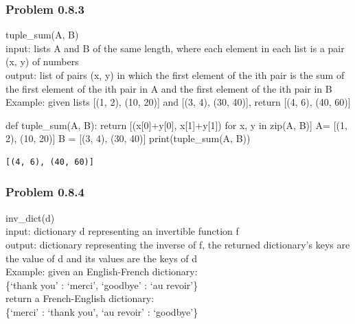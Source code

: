 \documentclass[
  letterpaper,
  DIV=11,
  numbers=noendperiod]{scrartcl}
\newenvironment{Shaded}{\begin{snugshade}}{\end{snugshade}}
\newcommand{\BuiltInTok}[1]{\textcolor[rgb]{0.00,0.23,0.31}{#1}}
\newcommand{\ControlFlowTok}[1]{\textcolor[rgb]{0.00,0.23,0.31}{#1}}
\newcommand{\DecValTok}[1]{\textcolor[rgb]{0.68,0.00,0.00}{#1}}
\newcommand{\KeywordTok}[1]{\textcolor[rgb]{0.00,0.23,0.31}{#1}}
\newcommand{\NormalTok}[1]{\textcolor[rgb]{0.00,0.23,0.31}{#1}}
\newcommand{\OperatorTok}[1]{\textcolor[rgb]{0.37,0.37,0.37}{#1}}
\begin{document}
\hypertarget{problem-0.8.3}{%
\subsubsection{Problem 0.8.3}\label{problem-0.8.3}}

tuple\_sum(A, B)\\
input: lists A and B of the same length, where each element in each list
is a pair (x, y) of numbers\\
output: list of pairs (x, y) in which the first element of the ith pair
is the sum of the first element of the ith pair in A and the first
element of the ith pair in B\\
Example: given lists {[}(1, 2), (10, 20){]} and {[}(3, 4), (30, 40){]},
return {[}(4, 6), (40, 60){]}

\begin{Shaded}
\begin{Highlighting}[numbers=left,,]
\KeywordTok{def}\NormalTok{ tuple\_sum(A, B): }\ControlFlowTok{return}\NormalTok{ [(x[}\DecValTok{0}\NormalTok{]}\OperatorTok{+}\NormalTok{y[}\DecValTok{0}\NormalTok{], x[}\DecValTok{1}\NormalTok{]}\OperatorTok{+}\NormalTok{y[}\DecValTok{1}\NormalTok{]) }\ControlFlowTok{for}\NormalTok{ x, y }\KeywordTok{in} \BuiltInTok{zip}\NormalTok{(A, B)]}
\NormalTok{A}\OperatorTok{=}\NormalTok{ [(}\DecValTok{1}\NormalTok{, }\DecValTok{2}\NormalTok{), (}\DecValTok{10}\NormalTok{, }\DecValTok{20}\NormalTok{)]}
\NormalTok{B }\OperatorTok{=}\NormalTok{ [(}\DecValTok{3}\NormalTok{, }\DecValTok{4}\NormalTok{), (}\DecValTok{30}\NormalTok{, }\DecValTok{40}\NormalTok{)]}
\BuiltInTok{print}\NormalTok{(tuple\_sum(A, B))}
\end{Highlighting}
\end{Shaded}

\begin{verbatim}
[(4, 6), (40, 60)]
\end{verbatim}

\hypertarget{problem-0.8.4}{%
\subsubsection{Problem 0.8.4}\label{problem-0.8.4}}

inv\_dict(d)\\
input: dictionary d representing an invertible function f\\
output: dictionary representing the inverse of f, the returned
dictionary's keys are the value of d and its values are the keys of d\\
Example: given an English-French dictionary:\\
\{`thank you' : `merci', `goodbye' : `au revoir'\}\\
return a French-English dictionary:\\
\{`merci' : `thank you', `au revoir' : `goodbye'\}
\end{document}
